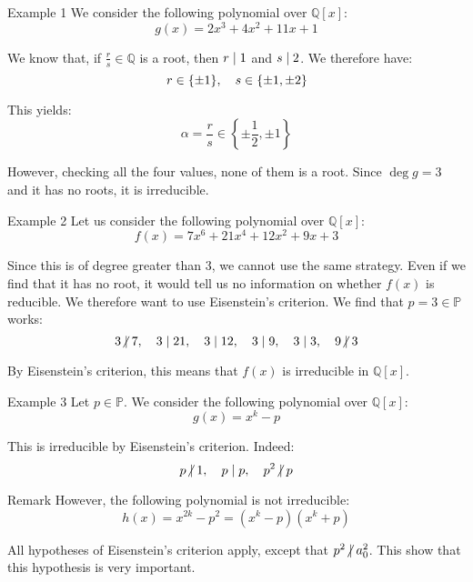 \documentclass[a4paper]{article}
\begin{document}
\begin{parag}{Example 1}
    We consider the following polynomial over $\mathbb{Q}\left[x\right]$: 
    \[g\left(x\right) = 2x^3 + 4x^2 + 11x + 1\]
    
    We know that, if $\frac{r}{s} \in \mathbb{Q}$ is a root, then $r \mid 1$ and $s \mid 2$. We therefore have: 
    \[r \in \left\{\pm 1\right\}, \mathspace s \in \left\{\pm 1, \pm 2\right\}\]
    
    This yields: 
    \[\alpha = \frac{r}{s} \in \left\{\pm \frac{1}{2}, \pm 1\right\}\]
    
    However, checking all the four values, none of them is a root. Since $\deg g = 3$ and it has no roots, it is irreducible.
\end{parag}

\begin{parag}{Example 2}
    Let us consider the following polynomial over $\mathbb{Q}\left[x\right]$: 
    \[f\left(x\right) = 7x^6 + 21 x^4 + 12 x^2 + 9x + 3\]
    
    Since this is of degree greater than 3, we cannot use the same strategy. Even if we find that it has no root, it would tell us no information on whether $f\left(x\right)$ is reducible. We therefore want to use Eisenstein's criterion. We find that $p = 3 \in \mathbb{P}$ works: 
    \[3 \ndivides 7, \mathspace 3 \divides 21, \mathspace 3 \divides 12, \mathspace 3\divides 9, \mathspace 3 \divides 3, \mathspace 9 \ndivides 3\]
    
    By Eisenstein's criterion, this means that $f\left(x\right)$ is irreducible in $\mathbb{Q}\left[x\right]$.
\end{parag}

\begin{parag}{Example 3}
    Let $p \in \mathbb{P}$. We consider the following polynomial over $\mathbb{Q}\left[x\right]$: 
    \[g\left(x\right) = x^k - p\]
    
    This is irreducible by Eisenstein's criterion. Indeed: 
    \[p \ndivides 1, \mathspace p \divides p, \mathspace p^2 \ndivides p\]
    
    \begin{subparag}{Remark}
        However, the following polynomial is not irreducible: 
        \[h\left(x\right) = x^{2k} - p^2 = \left(x^k - p\right)\left(x^k + p\right)\]
        
        All hypotheses of Eisenstein's criterion apply, except that $p^2 \ndivides a_0^2$. This show that this hypothesis is very important.
    \end{subparag}
\end{parag}
\end{document}
